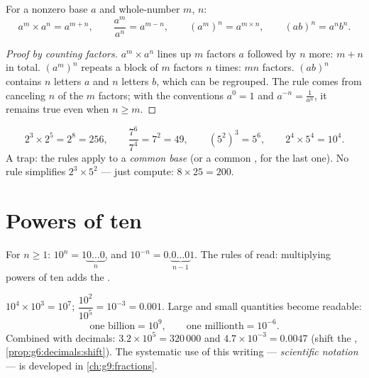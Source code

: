 \begin{theorem}\label{thm:g8:powers:rules}
For a nonzero base $a$ and whole-number  $m$, $n$:
\[
a^m \times a^n = a^{m+n},
\qquad
\frac{a^m}{a^n} = a^{m-n},
\qquad
\left(a^m\right)^n = a^{m \times n},
\qquad
(ab)^n = a^n b^n .
\]
\end{theorem}

\begin{proof}[Proof by counting factors]
$a^m \times a^n$ lines up $m$ factors $a$ followed by $n$ more:
$m + n$ in total. $\left(a^m\right)^n$ repeats a block of $m$ factors
$n$ times: $mn$ factors. $(ab)^n$ contains $n$ letters $a$ and $n$
letters $b$, which can be regrouped. The  rule comes from
canceling $n$ of the $m$ factors; with the conventions
$a^0 = 1$ and $a^{-n} = \frac{1}{a^n}$, it remains true even when
$n \geq m$.
\end{proof}

\begin{example}\label{ex:g8:powers:rules}
\[
2^3 \times 2^5 = 2^8 = 256,
\qquad
\frac{7^6}{7^4} = 7^2 = 49,
\qquad
\left(5^2\right)^3 = 5^6,
\qquad
2^4 \times 5^4 = 10^4 .
\]
A trap: the rules apply to a \emph{common base} (or a common
, for the last one). No rule simplifies $2^3 \times 5^2$ ---
just compute: $8 \times 25 = 200$.
\end{example}

\section{Powers of ten}

\begin{proposition}\label{prop:g8:powers:ten}
For $n \geq 1$: $10^n = 1\underbrace{0\dots0}_{n}$, and
$10^{-n} = 0.\underbrace{0\dots0}_{n-1}1$. The rules of 
read: multiplying powers of ten adds the .
\end{proposition}

\begin{example}\label{ex:g8:powers:ten}
$10^4 \times 10^3 = 10^7$; \quad
$\dfrac{10^2}{10^5} = 10^{-3} = 0.001$. Large and small quantities
become readable:
\[
\text{one billion} = 10^9,
\qquad
\text{one millionth} = 10^{-6}.
\]
Combined with decimals: $3.2 \times 10^5 = 320\,000$ and
$4.7 \times 10^{-3} = 0.0047$ (shift the ,
\cref{prop:g6:decimals:shift}). The systematic use of this writing ---
\emph{scientific notation} --- is developed in
\cref{ch:g9:fractions}.
\end{example}

